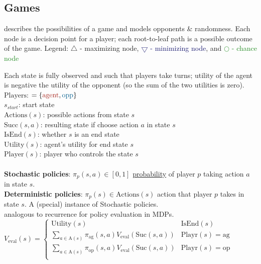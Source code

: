 \newcommand{\agentcolor}[1]{\textcolor{Mahogany}{#1}}
\newcommand{\oppcolor}[1]{\textcolor{MidnightBlue}{#1}}
\newcommand{\chancecolor}[1]{\textcolor{ForestGreen}{#1}}
\newcommand{\dcolor}[1]{\textcolor{Fuchsia}{#1}}

\subsection{Games}

 describes the possibilities of a game and models opponents \&
randomness. Each node is a decision point for a player; each root-to-leaf path
is a possible outcome of the game.  Legend: \agentcolor{$\bigtriangleup$ -
maximizing node}, \oppcolor{$\bigtriangledown$ - minimizing node}, and
\chancecolor{$\bigcirc$ - chance node}

 Each state is fully observed and such that
players take turns; utility of the agent is negative the utility of the opponent
(so the sum of the two utilities is zero).\\
\textbf{$\text{Players}$}: $ = \{\agentcolor{\text{agent}}, \oppcolor{\text{opp}}\}$\\
\textbf{$s_{start}$}: start state\\
\textbf{$\text{Actions}(s)$}: possible actions from state $s$\\
\textbf{$\text{Succ}(s, a)$}: resulting state if choose action $a$ in state $s$\\
\textbf{$\text{IsEnd}(s)$}: whether $s$ is an end state\\
\textbf{$\text{Utility}(s)$}: agent's utility for end state $s$\\
\textbf{$\text{Player}(s)$}: player who controls the state $s$\\

\\
\textbf{Stochastic policies}: $\pi_{p}(s, a) \in \left[0, 1\right]$
\underline{probability} of player $p$ taking action $a$ in state $s$.\\
\textbf{Deterministic policies}: $\pi_{p}(s) \in \text{Actions}(s)$ action that
player $p$ takes in state $s$. A (special) instance of Stochastic policies.\\

 analogous to recurrence for policy evaluation in MDPs.
$V_{\text{eval}}(s) = \begin{cases}
    \text{Utility}(s) & \text{IsEnd}(s) \\
    \sum_{a \in \text{A}(s)} \pi_{\text{ag}}(s, a) V_{\text{eval}}(\text{Suc}(s, a)) & \text{Playr}(s) = \text{ag} \\
    \sum_{a \in \text{A}(s)} \pi_{\text{op}}(s, a) V_{\text{eval}}(\text{Suc}(s, a)) & \text{Playr}(s) = \text{op} \\
\end{cases}$

